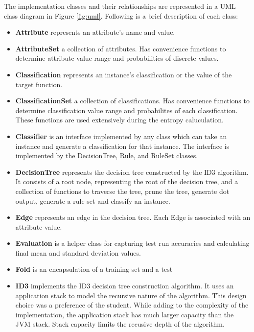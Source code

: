 \documentclass[10pt]{report}
\begin{document}
The implementation classes and their relationships are represented in a UML
class diagram in Figure \ref{fig:uml}. Following is a brief
description of each class:

\begin{itemize}
\item \textbf{Attribute} represents an attribute's name and value.

\item \textbf{AttributeSet} a collection of attributes. Has
  convenience functions to determine attribute value range and probabilities
  of discrete values.

\item \textbf{Classification} represents an instance's classification
  or the value of the target function.

\item \textbf{ClassificationSet} a collection of classifications. Has
  convenience functions to determine classification value range and
  probabilites of each classification. These functions are used
  extensively during the entropy caluculation.

\item \textbf{Classifier} is an interface implemented by any class
  which can take an instance and generate a classification for that
  instance. The interface is implemented by the DecisionTree, Rule,
  and RuleSet classes.

\item \textbf{DecisionTree} represents the decision tree constructed
  by the ID3 algorithm. It consists of a root node, representing the
  root of the decision tree, and a collection of functions to
  traverse the tree, prune the tree, generate dot output, generate a
  rule set and classify
  an instance. 

\item \textbf{Edge} represents an edge in the decision tree. Each Edge
  is associated with an attribute value.

\item \textbf{Evaluation} is a helper class for capturing test run
  accuracies and calculating final mean and standard deviation values.

\item \textbf{Fold} is an encapsulation of a training set and a test
 
\item \textbf{ID3} implements the ID3 decision tree construction
  algorithm. It uses an application stack to model the recursive
  nature of the algorithm. This design choice was a preference of the
  student. While adding to the complexity of the implementation, the
  application stack has much larger capacity than the JVM stack. Stack
  capacity limits the recusive depth of the algorithm.


\end{itemize}
\end{document}
